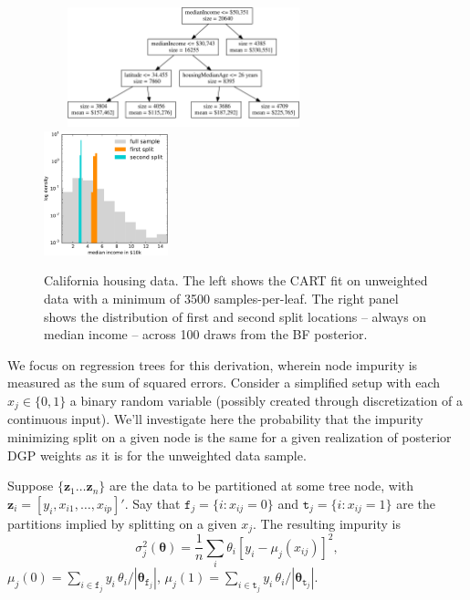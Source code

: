\documentclass{article}
\begin{document}
\begin{figure}
~~~
\includegraphics[width=0.6\textwidth]{../graphs/ca_trunk}
~~~~~~
\includegraphics[width=0.32\textwidth]{../graphs/ca_splits}
\caption{\label{calistable} California housing data.  The left shows the CART fit  on unweighted data with a minimum of 3500 samples-per-leaf. The right panel shows the distribution of first and second split locations -- always on median income  -- across 100 draws from the BF posterior. }
\end{figure}

We focus on regression trees for this derivation, wherein node impurity is
measured as the sum of squared errors. Consider a simplified setup
with each $x_j \in \{0,1\}$  a binary random variable (possibly
created through discretization of a continuous input).  We'll investigate here the probability that the impurity minimizing split on a given node is the same for a given realization of posterior DGP weights as it is for the unweighted data sample.   

Suppose  $\{\mathbf{z}_1 \ldots \mathbf{z}_n\}$ are the data to be partitioned at some tree node, with $\mathbf{z}_i = [y_i, x_{i1}, \dots, x_{ip}]'$.  Say that
$\texttt{f}_j=\{i:x_{ij}=0\}$ and $\texttt{t}_j=\{i:x_{ij}=1\}$ are the
partitions implied by splitting on a given $x_j$. The resulting impurity is
\begin{equation}
\sigma^2_j(\boldsymbol{\theta}) = \frac{1}{n}\sum_i \theta_i \left[y_i - \mu_j(x_{ij})\right]^2,
\end{equation}
$\mu_j(0) = \sum_{i \in \texttt{f}_j}y_i \,\theta_i/\left|\boldsymbol{\theta}_{\texttt{f}_j}\right|$,
$\mu_j(1) = \sum_{i \in \texttt{t}_j}y_i \,\theta_i/\left|\boldsymbol{\theta}_{\texttt{t}_j}\right|$.
\end{document}
